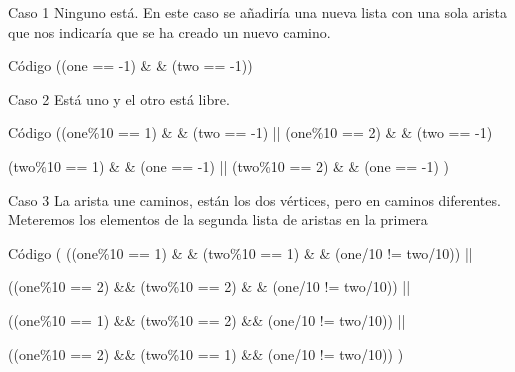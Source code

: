 \begin{frame}
	\begin{block}{Caso 1}
	Ninguno está. En este caso se añadiría una nueva lista
	con una sola arista que nos indicaría que se ha creado un nuevo camino.
	\end{block}
	
	\begin{exampleblock}{Código}
	\hspace{1cm}((one == -1) \& \& (two == -1))
	\end{exampleblock}
\end{frame}	
	
\begin{frame}
	\begin{block}{Caso 2}
	Está uno y el otro está libre.
	\end{block}
	
	\begin{exampleblock}{Código} 
	\hspace{1cm}((one\%10 == 1) \& \& (two == -1) || (one\%10 == 2) \& \& (two == -1)    
	
	\hspace{1cm}(two\%10 == 1) \& \& (one == -1) || (two\%10 == 2) \& \& (one == -1) )
	\end{exampleblock}
\end{frame}

\begin{frame}
	\begin{block}{Caso 3}
	La arista une caminos, están los dos vértices, pero en caminos diferentes.
	Meteremos los elementos de la segunda lista de aristas en la primera
	\end{block}
	
	\begin{exampleblock}{Código}            
	\hspace{1cm}( ((one\%10 == 1) \& \& (two\%10 == 1) \& \& (one/10 != two/10)) ||
	               
	\hspace{1cm}((one\%10 == 2) \&\& (two\%10 == 2) \& \& (one/10 != two/10)) ||

	\hspace{1cm}((one\%10 == 1) \&\& (two\%10 == 2) \&\& (one/10 != two/10)) ||

	\hspace{1cm}((one\%10 == 2) \&\& (two\%10 == 1) \&\& (one/10 != two/10)) )
	\end{exampleblock}
\end{frame}
           
